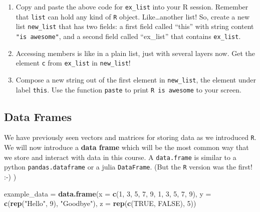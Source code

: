 \documentclass[]{book}
\newenvironment{Shaded}{\begin{snugshade}}{\end{snugshade}}
\newcommand{\KeywordTok}[1]{\textcolor[rgb]{0.13,0.29,0.53}{\textbf{#1}}}
\newcommand{\DataTypeTok}[1]{\textcolor[rgb]{0.13,0.29,0.53}{#1}}
\newcommand{\DecValTok}[1]{\textcolor[rgb]{0.00,0.00,0.81}{#1}}
\newcommand{\StringTok}[1]{\textcolor[rgb]{0.31,0.60,0.02}{#1}}
\newcommand{\OtherTok}[1]{\textcolor[rgb]{0.56,0.35,0.01}{#1}}
\newcommand{\NormalTok}[1]{#1}
\providecommand{\tightlist}{%
  \setlength{\itemsep}{0pt}\setlength{\parskip}{0pt}}
\theoremstyle{definition}
\theoremstyle{definition}
\theoremstyle{definition}
\theoremstyle{remark}
\begin{document}
\begin{enumerate}
\def\labelenumi{\arabic{enumi}.}
\tightlist
\item
  Copy and paste the above code for \texttt{ex\_list} into your R
  session. Remember that \texttt{list} can hold any kind of \texttt{R}
  object. Like\ldots{}another list! So, create a new list
  \texttt{new\_list} that has two fields: a first field called ``this''
  with string content \texttt{"is\ awesome"}, and a second field called
  ``ex\_list'' that contains \texttt{ex\_list}.
\item
  Accessing members is like in a plain list, just with several layers
  now. Get the element \texttt{c} from \texttt{ex\_list} in
  \texttt{new\_list}!
\item
  Compose a new string out of the first element in \texttt{new\_list},
  the element under label \texttt{this}. Use the function \texttt{paste}
  to print \texttt{R\ is\ awesome} to your screen.
\end{enumerate}

\subsection{Data Frames}\label{dataframes}

We have previously seen vectors and matrices for storing data as we
introduced \texttt{R}. We will now introduce a \textbf{data frame} which
will be the most common way that we store and interact with data in this
course. A \texttt{data.frame} is similar to a python
\texttt{pandas.dataframe} or a julia \texttt{DataFrame}. (But the
\texttt{R} version was the first! :-) )

\begin{Shaded}
\begin{Highlighting}[]
\NormalTok{example_data =}\StringTok{ }\KeywordTok{data.frame}\NormalTok{(}\DataTypeTok{x =} \KeywordTok{c}\NormalTok{(}\DecValTok{1}\NormalTok{, }\DecValTok{3}\NormalTok{, }\DecValTok{5}\NormalTok{, }\DecValTok{7}\NormalTok{, }\DecValTok{9}\NormalTok{, }\DecValTok{1}\NormalTok{, }\DecValTok{3}\NormalTok{, }\DecValTok{5}\NormalTok{, }\DecValTok{7}\NormalTok{, }\DecValTok{9}\NormalTok{),}
                          \DataTypeTok{y =} \KeywordTok{c}\NormalTok{(}\KeywordTok{rep}\NormalTok{(}\StringTok{"Hello"}\NormalTok{, }\DecValTok{9}\NormalTok{), }\StringTok{"Goodbye"}\NormalTok{),}
                          \DataTypeTok{z =} \KeywordTok{rep}\NormalTok{(}\KeywordTok{c}\NormalTok{(}\OtherTok{TRUE}\NormalTok{, }\OtherTok{FALSE}\NormalTok{), }\DecValTok{5}\NormalTok{))}
\end{Highlighting}
\end{Shaded}
\end{document}
